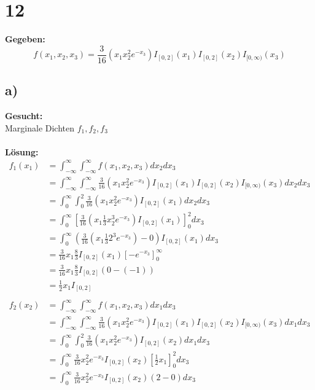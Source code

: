 \documentclass{article}
\begin{document}
\section*{12} 
\textbf{Gegeben:} \\

\[f(x_1, x_2, x_3) = \frac{3}{16}(x_1x_2^2e^{-x_3})I_{[0,2]}(x_1)I_{[0,2]}(x_2)I_{[0, \infty)}(x_3)\]
\subsection*{a)}
\textbf{Gesucht:} \\

Marginale Dichten $f_1, f_2, f_3$ \\ \\
\textbf{Lösung:} 
\begin{align*}
    f_1(x_1) &= \int_{-\infty}^{\infty}\int_{-\infty}^{\infty} f(x_1, x_2, x_3) dx_2 dx_3 \\
    &= \int_{-\infty}^{\infty}\int_{-\infty}^{\infty} \frac{3}{16}(x_1x_2^2e^{-x_3})I_{[0,2]}(x_1)I_{[0,2]}(x_2)I_{[0, \infty)}(x_3) dx_2 dx_3 \\
    &= \int_{0}^{\infty}\int_{0}^{2} \frac{3}{16}(x_1x_2^2e^{-x_3})I_{[0,2]}(x_1) dx_2 dx_3 \\
    &= \int_{0}^{\infty} \left[\frac{3}{16}(x_1\frac{1}{3}x_2^3e^{-x_3})I_{[0,2]}(x_1)\right]^{2}_0 dx_3 \\
    &= \int_{0}^{\infty} (\frac{3}{16}(x_1\frac{1}{3}2^3e^{-x_3}) - 0 )I_{[0,2]}(x_1) dx_3 \\
    &= \frac{3}{16}x_1\frac{8}{3}I_{[0,2]}(x_1)\left[-e^{-x_3}\right]_0^{\infty} \\
    &= \frac{3}{16}x_1\frac{8}{3}I_{[0,2]}(0 - (-1)) \\
    &= \frac{1}{2} x_1 I_{[0,2]} \\ \\
    f_2(x_2) &= \int_{-\infty}^{\infty}\int_{-\infty}^{\infty} f(x_1, x_2, x_3) dx_1 dx_3 \\
    &= \int_{-\infty}^{\infty}\int_{-\infty}^{\infty} \frac{3}{16}(x_1x_2^2e^{-x_3})I_{[0,2]}(x_1)I_{[0,2]}(x_2)I_{[0, \infty)}(x_3) dx_1 dx_3 \\
    &= \int_{0}^{\infty}\int_{0}^{2} \frac{3}{16}(x_1x_2^2e^{-x_3})I_{[0,2]}(x_2) dx_1 dx_3 \\
    &= \int_{0}^{\infty} \frac{3}{16}x_2^2e^{-x_3}I_{[0,2]}(x_2)\left[\frac{1}{2}x_1\right]^{2}_0 dx_3 \\
    &= \int_{0}^{\infty} \frac{3}{16}x_2^2e^{-x_3}I_{[0,2]}(x_2)(2 - 0) dx_3 \\

\end{align*}
\end{document}
